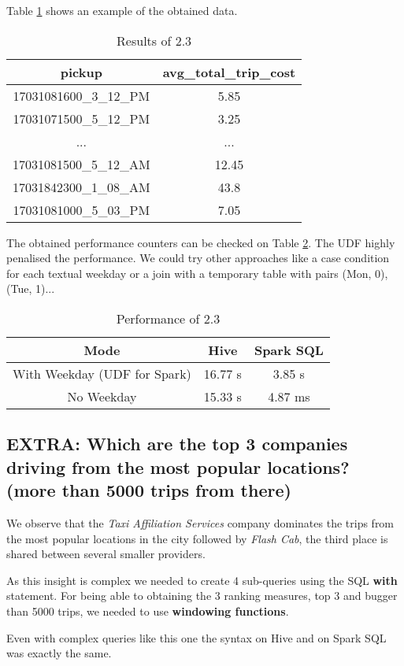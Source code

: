 \documentclass[conference,compsoc]{IEEEtran}
\begin{document}
 Table \ref{output_2_3} shows an example of the obtained data. \par


\begin{table}[!t]
\renewcommand{\arraystretch}{1.3}
\caption{Results of 2.3}
\label{output_2_3}
\centering
\begin{tabular}{c||c}
\hline
\bfseries pickup              & \bfseries avg\_total\_trip\_cost\\
\hline\hline
17031081600\_3\_12\_PM & 5.85               \\
17031071500\_5\_12\_PM & 3.25               \\
... & ...   \\
17031081500\_5\_12\_AM & 12.45              \\
17031842300\_1\_08\_AM & 43.8               \\
17031081000\_5\_03\_PM & 7.05               \\
\hline
\end{tabular}
\end{table}

The obtained performance counters can be checked on Table \ref{perf_2_3}.
The UDF highly penalised the performance. We could try other approaches like a case condition for each textual weekday or a join with a temporary table with pairs (Mon, 0),(Tue, 1)...
\begin{table}[!t]
\renewcommand{\arraystretch}{1.3}
\caption{Performance of 2.3}
\label{perf_2_3}
\centering
\begin{tabular}{c||c|c}
\hline
\bfseries Mode &\bfseries Hive & \bfseries Spark SQL \\
\hline\hline
With Weekday (UDF for Spark) & 16.77 s         & 3.85 s    \\
No Weekday & 15.33 s  & 4.87 ms \\
\hline
\end{tabular}
\end{table}


\subsection{EXTRA: Which are the top 3 companies driving from the most popular locations? (more than 5000 trips from there)}
We observe that the \textit{Taxi Affiliation Services} company dominates the trips from the most popular locations in the city followed by \textit{Flash Cab}, the third place is shared between several smaller providers. \par
As this insight is complex we needed to create 4 sub-queries using the SQL \textbf{with} statement. For being able to obtaining the 3 ranking measures, top 3 and bugger than 5000 trips, we needed to use \textbf{windowing functions}. \par
Even with complex queries like this one the syntax on Hive and on Spark SQL was exactly the same.
\end{document}
